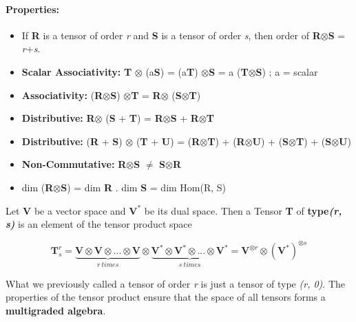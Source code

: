 \paragraph{\textbf{Properties:}}
\begin{itemize}
    \item If \textbf{R} is a tensor of order \textit{r} and \textbf{S} is a tensor of order \textit{s}, then order of \textbf{R}$\otimes$\textbf{S} = \textit{r}+\textit{s}.
    \item \textbf{Scalar Associativity: } \textbf{T} $\otimes$ (a\textbf{S}) = (a\textbf{T}) $\otimes$\textbf{S} = a (\textbf{T}$\otimes$\textbf{S}) \hspace{2cm}; a = scalar
    \item \textbf{Associativity: } (\textbf{R}$\otimes$\textbf{S}) $\otimes$\textbf{T} = \textbf{R}$\otimes$ (\textbf{S}$\otimes$\textbf{T})
    \item \textbf{Distributive: } \textbf{R}$\otimes$ (\textbf{S} + \textbf{T}) = \textbf{R}$\otimes$\textbf{S} + \textbf{R}$\otimes$\textbf{T}
    \item \textbf{Distributive: } (\textbf{R} + \textbf{S}) $\otimes$ (\textbf{T} + \textbf{U}) = (\textbf{R}$\otimes$\textbf{T}) + (\textbf{R}$\otimes$\textbf{U}) + (\textbf{S}$\otimes$\textbf{T}) + (\textbf{S}$\otimes$\textbf{U}) 
    \item \textbf{Non-Commutative: } \textbf{R}$\otimes$\textbf{S} $\neq$ \textbf{S}$\otimes$\textbf{R}
    \item dim (\textbf{R}$\otimes$\textbf{S}) = dim \textbf{R} . dim \textbf{S} = dim Hom(R, S)
\end{itemize}

Let \textbf{V} be a  vector space and $\textbf{V}^*$ be its dual space. Then a Tensor \textbf{T}
of \textbf{type\textit{(r, s)}} is an element of the tensor product space

\begin{equation}
    \textbf{T}_s^r = \underbrace{\textbf{V} \otimes \textbf{V} \otimes ... \otimes \textbf{V}}_{r \:times} \otimes \underbrace{\textbf{V}^* \otimes \textbf{V}^* \otimes ... \otimes \textbf{V}^*}_{s\: times} = \textbf{V}^{\otimes r} \otimes (\textbf{V}^*)^{\otimes s}
\end{equation}

What we previously called a tensor of order \textit{r} is just a tensor of type \textit{(r, 0)}.
The properties of the tensor product ensure that the space of all tensors forms a
\textbf{multigraded algebra}.

